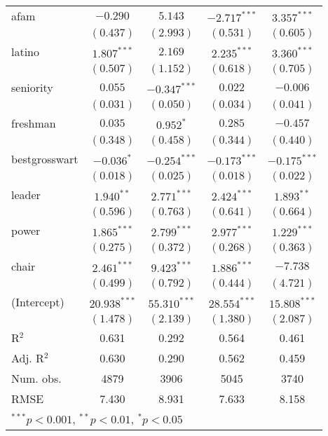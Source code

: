 \documentclass[12pt]{article}
\begin{document}
\begin{table}
\begin{center}
\begin{tabular}{l c c c c }
			afam                   & $-0.290$       & $5.143$        & $-2.717^{***}$ & $3.357^{***}$  \\
			& $(0.437)$      & $(2.993)$      & $(0.531)$      & $(0.605)$      \\
			latino                 & $1.807^{***}$  & $2.169$        & $2.235^{***}$  & $3.360^{***}$  \\
			& $(0.507)$      & $(1.152)$      & $(0.618)$      & $(0.705)$      \\
			seniority              & $0.055$        & $-0.347^{***}$ & $0.022$        & $-0.006$       \\
			& $(0.031)$      & $(0.050)$      & $(0.034)$      & $(0.041)$      \\
			freshman               & $0.035$        & $0.952^{*}$    & $0.285$        & $-0.457$       \\
			& $(0.348)$      & $(0.458)$      & $(0.344)$      & $(0.440)$      \\
			bestgrosswart          & $-0.036^{*}$   & $-0.254^{***}$ & $-0.173^{***}$ & $-0.175^{***}$ \\
			& $(0.018)$      & $(0.025)$      & $(0.018)$      & $(0.022)$      \\
			leader                 & $1.940^{**}$   & $2.771^{***}$  & $2.424^{***}$  & $1.893^{**}$   \\
			& $(0.596)$      & $(0.763)$      & $(0.641)$      & $(0.664)$      \\
			power                  & $1.865^{***}$  & $2.799^{***}$  & $2.977^{***}$  & $1.229^{***}$  \\
			& $(0.275)$      & $(0.372)$      & $(0.268)$      & $(0.363)$      \\
			chair                  & $2.461^{***}$  & $9.423^{***}$  & $1.886^{***}$  & $-7.738$       \\
			& $(0.499)$      & $(0.792)$      & $(0.444)$      & $(4.721)$      \\
			(Intercept)            & $20.938^{***}$ & $55.310^{***}$ & $28.554^{***}$ & $15.808^{***}$ \\
			& $(1.478)$      & $(2.139)$      & $(1.380)$      & $(2.087)$      \\
			\hline
			R$^2$                  & 0.631          & 0.292          & 0.564          & 0.461          \\
			Adj. R$^2$             & 0.630          & 0.290          & 0.562          & 0.459          \\
			Num. obs.              & 4879           & 3906           & 5045           & 3740           \\
			RMSE                   & 7.430          & 8.931          & 7.633          & 8.158          \\
			\hline
			\multicolumn{5}{l}{\scriptsize{$^{***}p<0.001$, $^{**}p<0.01$, $^*p<0.05$}}
		\end{tabular}
	\end{center}
\end{table}
\end{document}
